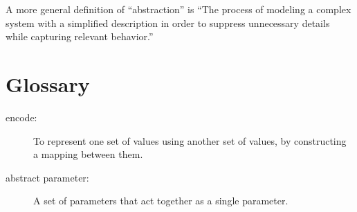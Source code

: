 
A more general definition of ``abstraction'' is ``The process of
modeling a complex system with a simplified description in order to
suppress unnecessary details while capturing relevant behavior.''

\section{Glossary}

\begin{description}

\item[encode:]  To represent one set of values using another
set of values, by constructing a mapping between them.

\item[abstract parameter:]  A set of parameters that act together
as a single parameter.


\end{description}


